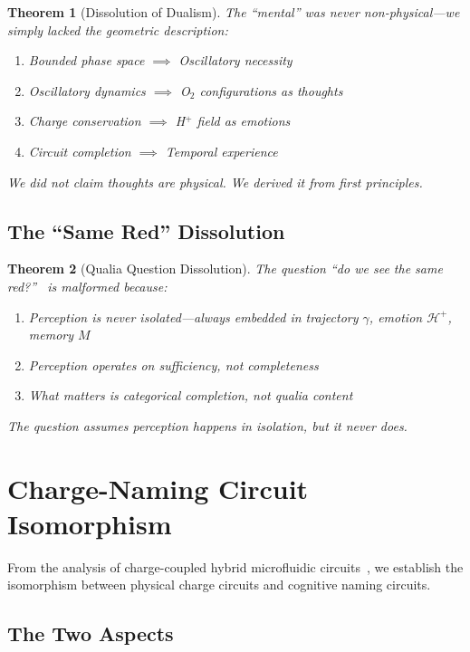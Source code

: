 \documentclass[aps,prd,twocolumn,superscriptaddress,floatfix,nofootinbib]{revtex4-2}
\newtheorem{theorem}{Theorem}[section]
\theoremstyle{remark}
\newcommand{\Hfield}{\mathcal{H}^+}
\begin{document}
\begin{theorem}[Dissolution of Dualism]
\label{thm:no_dualism}
The ``mental'' was never non-physical---we simply lacked the geometric description:
\begin{enumerate}
\item Bounded phase space $\implies$ Oscillatory necessity
\item Oscillatory dynamics $\implies$ O$_2$ configurations as thoughts
\item Charge conservation $\implies$ H$^+$ field as emotions
\item Circuit completion $\implies$ Temporal experience
\end{enumerate}
We did not \emph{claim} thoughts are physical. We \emph{derived} it from first principles.
\end{theorem}

\subsection{The ``Same Red'' Dissolution}

\begin{theorem}[Qualia Question Dissolution]
\label{thm:qualia}
The question ``do we see the same red?''~\cite{nagel1974like,jackson1982epiphenomenal} is malformed because:
\begin{enumerate}
\item Perception is never isolated---always embedded in trajectory $\gamma$, emotion $\Hfield$, memory $M$
\item Perception operates on sufficiency, not completeness
\item What matters is categorical completion, not qualia content
\end{enumerate}
The question assumes perception happens in isolation, but it never does.
\end{theorem}

\section{Charge-Naming Circuit Isomorphism}
\label{sec:isomorphism}

From the analysis of charge-coupled hybrid microfluidic circuits~\cite{sachikonye2024circuits}, we establish the isomorphism between physical charge circuits and cognitive naming circuits.

\subsection{The Two Aspects}
\end{document}
